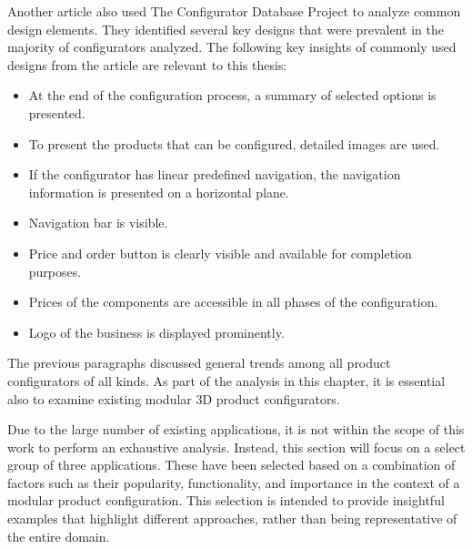 Another article \cite{Leitner2014} also used The Configurator Database Project to analyze common design elements. They identified several key designs that were prevalent in the majority of configurators analyzed. The following key insights of commonly used designs from the article are relevant to this thesis:
\begin{itemize}[label=\rectanglebullet]
    \item At the end of the configuration process, a summary of selected options is presented.
    \item To present the products that can be configured, detailed images are used.
    \item If the configurator has linear predefined navigation, the navigation information is presented on a horizontal plane.
    \item Navigation bar is visible.
    \item Price and order button is clearly visible and available for completion purposes.
    \item Prices of the components are accessible in all phases of the configuration.
    \item Logo of the business is displayed prominently.
\end{itemize}

The previous paragraphs discussed general trends among all product configurators of all kinds. As part of the analysis in this chapter, it is essential also to examine existing modular 3D product configurators. 

Due to the large number of existing applications, it is not within the scope of this work to perform an exhaustive analysis. Instead, this section will focus on a select group of three applications. These have been selected based on a combination of factors such as their popularity, functionality, and importance in the context of a modular product configuration. This selection is intended to provide insightful examples that highlight different approaches, rather than being representative of the entire domain.

